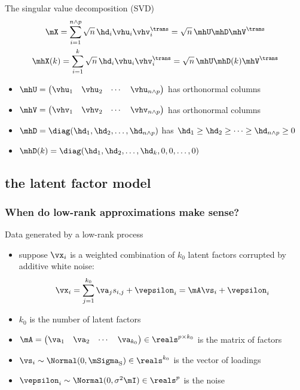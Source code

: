 \documentclass{beamer}
\begin{document}
\begin{frame}{The singular value decomposition (SVD)}
  \begin{gather*}
    \mX = \sum_{i=1}^{n \wedge p} \sqrt{n} \, \hd_i \vhu_i \vhv_i^\trans = \sqrt{n} \, \mhU \mhD \mhV^\trans \\
    \mhX(k) = \sum_{i=1}^k \sqrt{n} \, \hd_i \vhu_i \vhv_i^\trans = \sqrt{n} \, \mhU \mhD(k) \mhV^\trans
  \end{gather*}

  \begin{itemize}
  \item $\mhU = \left(\begin{matrix} \vhu_1 & \vhu_2 & \cdots & \vhu_{n \wedge p} \end{matrix}\right)$ has orthonormal columns
  \item $\mhV = \left(\begin{matrix} \vhv_1 & \vhv_2 & \cdots & \vhv_{n \wedge p} \end{matrix}\right)$ has orthonormal columns
  \item $\mhD = \diag(\hd_1, \hd_2, \ldots, \hd_{n \wedge p})$ has 
    $\hd_1 \geq \hd_2 \geq \cdots \geq \hd_{n \wedge p} \geq 0$
  \item $\mhD(k) = \diag(\hd_1, \hd_2, \ldots, \hd_k, 0, 0, \ldots, 0)$ 
  \end{itemize}
\end{frame}


\subsection{the latent factor model}

\begin{frame}
\frametitle{When do low-rank approximations make sense?}
  \begin{block}{Data generated by a low-rank process}
    \begin{itemize}
    \item suppose $\vx_i$ is a weighted combination of $k_0$ latent factors corrupted by additive white noise:
      \[ \vx_i = \sum_{j=1}^{k_0} \va_j s_{i,j} + \vepsilon_i = \mA \vs_i + \vepsilon_i \]
    \item $k_0$ is the number of latent factors
    \item $\mA = \left(\begin{matrix} \va_1 & \va_2 & \cdots & \va_{k_0}\end{matrix}\right) \in \reals^{p \times k_0}$ is the matrix of factors
    \item $\vs_i \sim \Normal(0, \mSigma_\text{S}) \in \reals^{k_0}$ is the vector of loadings 
    \item $\vepsilon_i \sim \Normal(0, \sigma^2 \mI) \in \reals^p$ is the noise
    \end{itemize}
  \end{block}
\end{frame}
\end{document}
